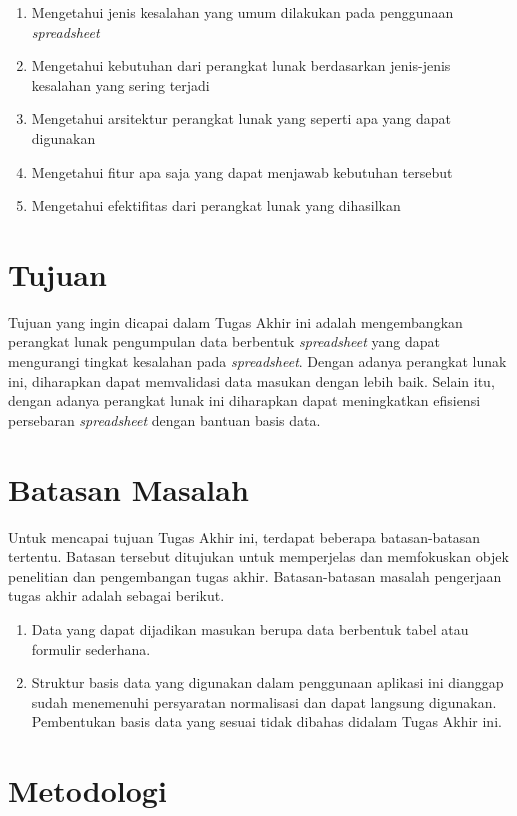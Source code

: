 \begin{enumerate}
    \item Mengetahui jenis kesalahan yang umum dilakukan pada penggunaan \textit{spreadsheet}
    \item Mengetahui kebutuhan dari perangkat lunak berdasarkan jenis-jenis kesalahan yang sering terjadi
    \item Mengetahui arsitektur perangkat lunak yang seperti apa yang dapat digunakan
    \item Mengetahui fitur apa saja yang dapat menjawab kebutuhan tersebut
    \item Mengetahui efektifitas dari perangkat lunak yang dihasilkan
\end{enumerate}

\section{Tujuan}

Tujuan yang ingin dicapai dalam Tugas Akhir ini adalah mengembangkan perangkat lunak pengumpulan data berbentuk \textit{spreadsheet} yang dapat mengurangi tingkat kesalahan pada \textit{spreadsheet}. Dengan adanya perangkat lunak ini, diharapkan dapat memvalidasi data masukan dengan lebih baik. Selain itu, dengan adanya perangkat lunak ini diharapkan dapat meningkatkan efisiensi persebaran \textit{spreadsheet} dengan bantuan basis data.

\section{Batasan Masalah}

Untuk mencapai tujuan Tugas Akhir ini, terdapat beberapa batasan-batasan tertentu. Batasan tersebut ditujukan untuk memperjelas dan memfokuskan objek penelitian dan pengembangan tugas akhir. Batasan-batasan masalah pengerjaan tugas akhir adalah sebagai berikut.

\begin{enumerate}
    \item Data yang dapat dijadikan masukan berupa data berbentuk tabel atau formulir sederhana.
    \item Struktur basis data yang digunakan dalam penggunaan aplikasi ini dianggap sudah menemenuhi persyaratan normalisasi dan dapat langsung digunakan. Pembentukan basis data yang sesuai tidak dibahas didalam Tugas Akhir ini.
\end{enumerate}

\section{Metodologi}

